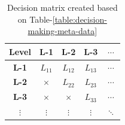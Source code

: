 \begin{table}
    \begin{tabular}{ |c|c|c|c|c| }
        \hline
        \hspace*{4.1mm}\textbf{Level}\hspace*{4.1mm} & \hspace*{4.1mm}\textbf{L-1}\hspace*{4.1mm} & \hspace*{4.1mm}\textbf{L-2}\hspace*{4.1mm} & \hspace*{4.1mm}\textbf{L-3}\hspace*{4.1mm} & \hspace*{4mm}$\cdots$\hspace*{4mm} \\
        \hline
        \textbf{L-1} & $L_{11}$ & $L_{12}$ & $L_{13}$ & $\cdots$ \\
        \hline
        \textbf{L-2} & $\times$ & $L_{22}$ & $L_{23}$ & $\cdots$ \\
        \hline
        \textbf{L-3} &  $\times$ &  $\times$ & $L_{33}$ & $\cdots$ \\
        \hline
        $\vdots$ &  $\vdots$ &  $\vdots$ & $\vdots$ & $\ddots$ \\
        \hline
    \end{tabular}
    \caption{Decision matrix created based on Table-\ref{table:decision-making-meta-data}}
    \label{table:decision-matrix}
\end{table}

